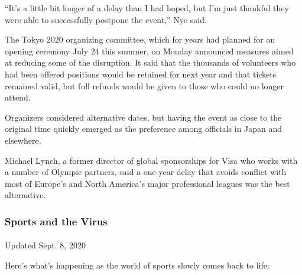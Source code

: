 ``It's a little bit longer of a delay than I had hoped, but I'm just
thankful they were able to successfully postpone the event,'' Nye said.

The Tokyo 2020 organizing committee, which for years had planned for an
opening ceremony July 24 this summer, on Monday announced measures aimed
at reducing some of the disruption. It said that the thousands of
volunteers who had been offered positions would be retained for next
year and that tickets remained valid, but full refunds would be given to
those who could no longer attend.

Organizers considered alternative dates, but having the event as close
to the original time quickly emerged as the preference among officials
in Japan and elsewhere.

Michael Lynch, a former director of global sponsorships for Visa who
works with a number of Olympic partners, said a one-year delay that
avoids conflict with most of Europe's and North America's major
professional leagues was the best alternative.

\hypertarget{sports-and-the-virus}{%
\subsubsection{Sports and the Virus}\label{sports-and-the-virus}}

\paragraph{}

Updated Sept. 8, 2020

Here's what's happening as the world of sports slowly comes back to
life:

